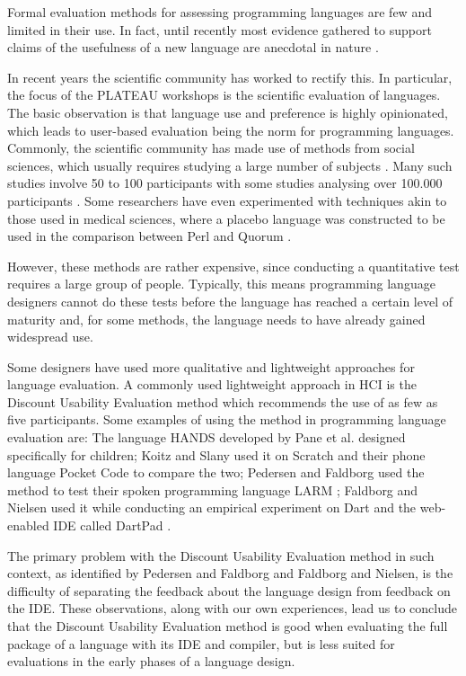 \documentclass[preprint,10pt]{sigplanconf}
\begin{document}
Formal evaluation methods for assessing programming languages are few and limited in their use. In fact, until recently most evidence gathered to support claims of the usefulness of a new language are anecdotal in nature \cite{StakingClaims}. 

In recent years the scientific community has worked to rectify this.
In particular, the focus of the PLATEAU workshops is the scientific evaluation of languages.
The basic observation is that language use and preference is highly opinionated, which leads to user-based evaluation being the norm for programming languages.
Commonly, the scientific community has made use of methods from social sciences, which usually requires studying a large number of subjects \cite{SocioPLT}\cite{AliceCS1}\cite{BlockOrNot}\cite{FromScratch}.
Many such studies involve 50 to 100 participants \cite{hanenberg2010experiment}\cite{EmpStudiesonStimuli} with some studies analysing over 100.000 participants \cite{brown2014investigating}.
Some researchers have even experimented with techniques akin to those used in medical sciences, where a placebo language was constructed to be used in the comparison between Perl and Quorum \cite{stefik2011empirical}.

However, these methods are rather expensive, since conducting a quantitative test requires a large group of people. Typically, this means programming language designers cannot do these tests before the language has reached a certain level of maturity and, for some methods, the language needs to have already gained widespread use. 

Some designers have used more qualitative and lightweight approaches for language evaluation. A commonly used lightweight approach in HCI is the Discount Usability Evaluation method \cite{CooperativeEval} which recommends the use of as few as five participants. Some examples of using the method in programming language evaluation are: The language HANDS developed by Pane et al. \cite{HANDS} designed specifically for children; Koitz and Slany \cite{PocketCode} used it on Scratch and their phone language Pocket Code to compare the two; Pedersen and Faldborg used the method to test their spoken programming language LARM \cite{LARM}; Faldborg and Nielsen used it while conducting an empirical experiment on Dart and the web-enabled IDE called DartPad \cite{DART}.

The primary problem with the Discount Usability Evaluation method in such context, as identified by Pedersen and Faldborg and Faldborg and Nielsen, is the difficulty of separating the feedback about the language design from feedback on the IDE.
These observations, along with our own experiences, lead us to conclude that the Discount Usability Evaluation method is good when evaluating the full package of a language with its IDE and compiler, but is less suited for evaluations in the early phases of a language design.
\end{document}
